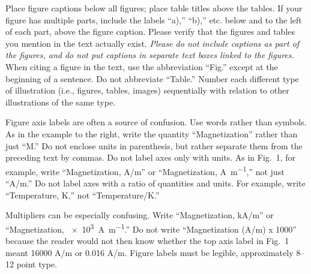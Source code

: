 \documentclass[conf]{new-aiaa}
\begin{document}


Place figure captions below all figures; place table titles above the tables. If your figure has multiple parts, include the labels ``a),'' ``b),'' etc. below and to the left of each part, above the figure caption. Please verify that the figures and tables you mention in the text actually exist. \emph{Please do not include captions as part of the figures, and do not put captions in separate text boxes linked to the figures.} When citing a figure in the text, use the abbreviation ``Fig.'' except at the beginning of a sentence. Do not abbreviate ``Table.'' Number each different type of illustration (i.e., figures, tables, images) sequentially with relation to other illustrations of the same type.

Figure axis labels are often a source of confusion. Use words rather than symbols. As in the example to the right, write the quantity ``Magnetization'' rather than just ``M.'' Do not enclose units in parenthesis, but rather separate them from the preceding text by commas. Do not label axes only with units. As in Fig.~1, for example, write ``Magnetization, \si[per-mode=symbol]{\ampere\per\meter}'' or ``Magnetization, \si[inter-unit-product=\ensuremath{{}\cdot{}}]{\ampere\per\meter},'' not just ``A/m.'' Do not label axes with a ratio of quantities and units. For example, write ``Temperature, K,'' not ``Temperature/K.''

Multipliers can be especially confusing. Write ``Magnetization, \si[per-mode=symbol]{\kilo\ampere\per\meter}'' or ``Magnetization, \SI[per-mode=symbol]{e3}{\ampere\per\meter}.'' Do not write ``Magnetization (A/m) x 1000'' because the reader would not then know whether the top axis label in Fig.~1 meant 16000 A/m or 0.016 A/m. Figure labels must be legible, approximately 8--12 point type.
\end{document}
